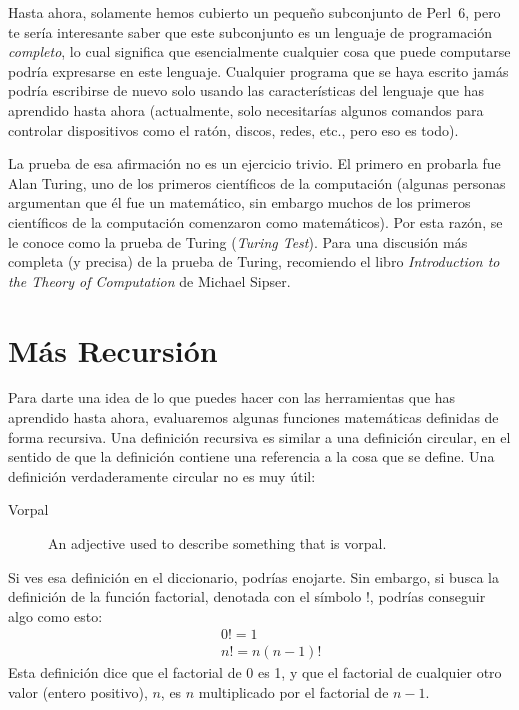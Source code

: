 Hasta ahora, solamente hemos cubierto un pequeño subconjunto de Perl~6,
pero te sería interesante saber que este subconjunto es un lenguaje
de programación \emph{completo}, lo cual significa que esencialmente
cualquier cosa que puede computarse podría expresarse en este 
lenguaje. Cualquier programa que se haya escrito jamás podría escribirse
de nuevo solo usando las características del lenguaje que has aprendido
hasta ahora (actualmente, solo necesitarías algunos comandos para
controlar dispositivos como el ratón, discos, redes, etc., pero eso 
es todo).

La prueba de esa afirmación no es un ejercicio trivio. El primero
en probarla fue Alan Turing, uno de los primeros científicos de la
computación (algunas personas argumentan que él fue un matemático, sin 
embargo muchos de los primeros científicos de la computación comenzaron 
como matemáticos). Por esta razón, se le conoce como la prueba de Turing
(\emph{Turing Test}). Para una discusión más completa (y precisa) de la
prueba de Turing, recomiendo el libro  {\em Introduction to the
Theory of Computation} de Michael Sipser.

\section{Más Recursión}
\label{more.recursion}


Para darte una idea de lo que puedes hacer con las herramientas
que has aprendido hasta ahora, evaluaremos algunas funciones 
matemáticas definidas de forma recursiva. Una definición recursiva
es similar a una definición circular, en el sentido de que la 
definición contiene una referencia a la cosa que se define. 
Una definición verdaderamente circular no es muy útil:

\begin{description}

\item[Vorpal] An adjective used to describe something that is vorpal.

\end{description}

Si ves esa definición en el diccionario, podrías enojarte. 
Sin embargo, si busca la definición de la función factorial,
denotada con el símbolo $!$, podrías conseguir algo como esto:
%
\begin{eqnarray*}
&&  0! = 1 \\
&&  n! = n (n-1)!
\end{eqnarray*}
%
Esta definición dice que el factorial de 0 es 1, y que el factorial
de cualquier otro valor (entero positivo), $n$, es 
$n$ multiplicado por el factorial de $n-1$.

